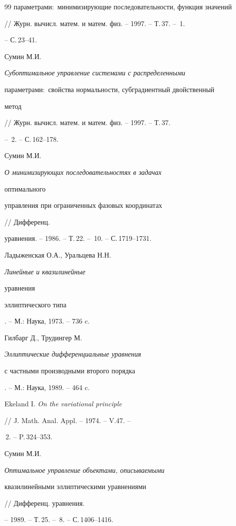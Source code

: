 \begin{thebibliography}{99}
{параметрами$:$ минимизирующие последовательности, функция значений} 


// Журн. вычисл. матем. и матем. физ. -- 1997. -- Т.\,37. -- \No\,1. 


-- С.\,23--41. 




Сумин М.И. {\em Субоптимальное управление системами с распределенными 


параметрами$:$ свойства нормальности, субградиентный двойственный 


метод} 


// Журн. вычисл. матем. и матем. физ. -- 1997. -- Т.\,37. 


-- \No\,2. -- С.\,162--178. 




Сумин М.И. {\em О минимизирующих последовательностях в задачах 


оптимального 


управления при ограниченных фазовых координатах} // Дифференц. 


уравнения. -- 1986. -- Т.\,22. -- \No\,10. -- С.\,1719--1731. 




Ладыженская О.А., Уральцева Н.Н. {\em Линейные и квазилинейные 


уравнения 


эллиптического типа}. -- М.: Наука, 1973. -- 736 c. 




Гилбарг Д., Трудингер М. {\em Эллиптические дифференциальные уравнения 


с частными производными второго порядка}. -- М.: Наука, 1989. -- 464 c. 




Ekeland I. {\em On the variational principle} 


// J. Math. Anal. Appl. -- 1974. -- V.47. -- 


\No\,2. -- P.\,324--353. 




Сумин М.И. {\em Оптимальное управление объектами, описываемыми 


квазилинейными эллиптическими уравнениями} // Дифференц. уравнения. 


-- 1989. -- Т.\,25. -- \No\,8. -- С.\,1406--1416. 


 


\end{thebibliography} 


 


\vskip 2cm 


 






 


\label{end} 


 


 


